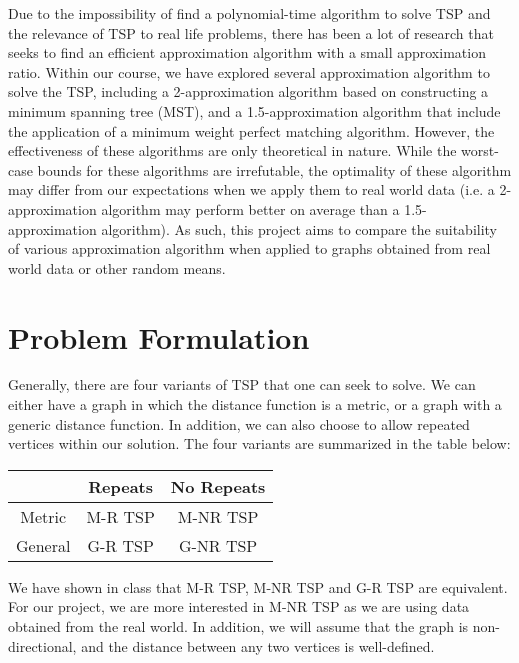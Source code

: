 \documentclass[paper=a4, fontsize=11pt]{scrartcl}	%
\numberwithin{equation}{section}		%
\numberwithin{figure}{section}			%
\numberwithin{table}{section}				%
\begin{document}
Due to the impossibility of find a polynomial-time algorithm to solve TSP and the relevance of TSP to real life problems, there has been a lot of research that seeks to find an efficient approximation algorithm with a small approximation ratio. Within our course, we have explored several approximation algorithm to solve the TSP, including a 2-approximation algorithm based on constructing a minimum spanning tree (MST), and a 1.5-approximation algorithm that include the application of a minimum weight perfect matching algorithm. However, the effectiveness of these algorithms are only theoretical in nature. While the worst-case bounds for these algorithms are irrefutable, the optimality of these algorithm may differ from our expectations when we apply them to real world data (i.e. a 2-approximation algorithm may perform better on average than a 1.5-approximation algorithm). As such, this project aims to compare the suitability of various approximation algorithm when applied to graphs obtained from real world data or other random means. 

\section{Problem Formulation}

Generally, there are four variants of TSP that one can seek to solve. We can either have a graph in which the distance function is a metric, or a graph with a generic distance function. In addition, we can also choose to allow repeated vertices within our solution. The four variants are summarized in the table below:

\begin{table}[h]
\centering
\begin{tabular}{|c|c|c|}
\hline
\multicolumn{1}{|l|}{} & Repeats & No Repeats \\ \hline
Metric                 & M-R TSP & M-NR TSP   \\ \hline
General                & G-R TSP & G-NR TSP   \\ \hline
\end{tabular}
\end{table}

We have shown in class that M-R TSP, M-NR TSP and G-R TSP are equivalent. For our project, we are more interested in M-NR TSP as we are using data obtained from the real world. In addition, we will assume that the graph is non-directional, and the distance between any two vertices is well-defined. 
\end{document}
